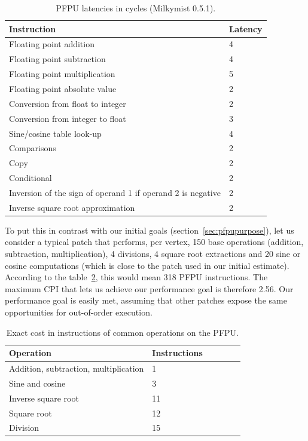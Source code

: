 \documentclass[a4paper,11pt]{kthesis}
\begin{document}
\begin{table}
\centering
\begin{tabularx}{13cm}{|X|l|}
\hline
\textbf{Instruction} & \textbf{Latency} \\
\hline
Floating point addition & 4 \\
\hline
Floating point subtraction & 4 \\
\hline
Floating point multiplication & 5 \\
\hline
Floating point absolute value & 2 \\
\hline
Conversion from float to integer & 2 \\
\hline
Conversion from integer to float & 3 \\
\hline
Sine/cosine table look-up & 4 \\
\hline
Comparisons & 2 \\
\hline
Copy & 2 \\
\hline
Conditional & 2 \\
\hline
Inversion of the sign of operand 1 if operand 2 is negative & 2 \\
\hline
Inverse square root approximation & 2 \\
\hline
\end{tabularx}
\caption{PFPU latencies in cycles (Milkymist 0.5.1).}\label{tab:pfpulatency}
\end{table}

To put this in contrast with our initial goals (section~\ref{sec:pfpupurpose}), let us consider a typical patch that performs, per vertex, 150 base operations (addition, subtraction, multiplication), 4 divisions, 4 square root extractions and 20 sine or cosine computations (which is close to the patch used in our initial estimate). According to the table~\ref{tab:pfpucost}, this would mean 318 PFPU instructions. The maximum CPI that lets us achieve our performance goal is therefore 2.56. Our performance goal is easily met, assuming that other patches expose the same opportunities for out-of-order execution.

\begin{table}
\centering
\begin{tabularx}{13cm}{|X|l|l|l|l|l|}
\hline
\textbf{Operation} & \textbf{Instructions} \\
\hline
Addition, subtraction, multiplication & 1 \\
\hline
Sine and cosine & 3 \\
\hline
Inverse square root & 11 \\
\hline
Square root & 12 \\
\hline
Division & 15 \\
\hline
\end{tabularx}
\caption{Exact cost in instructions of common operations on the PFPU.}\label{tab:pfpucost}
\end{table}
\end{document}

